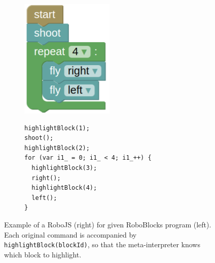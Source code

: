 

\begin{figure}[h]
\begin{subfigure}{.28\textwidth}
\centering\includegraphics[width=.8\textwidth]{img/roboblocks-english}
\end{subfigure}
\begin{subfigure}{.7\textwidth}
{\lstset{numbers=none}
\begin{lstlisting}
highlightBlock(1);
shoot();
highlightBlock(2);
for (var i1_ = 0; i1_ < 4; i1_++) {
  highlightBlock(3);
  right();
  highlightBlock(4);
  left();
}
\end{lstlisting}}
\end{subfigure}
\caption{%
  Example of a RoboJS (right) for given RoboBlocks program (left). %
  Each original command is accompanied by \texttt{highlightBlock(blockId)},
  so that the meta-interpreter knows which block to highlight.}
\label{fig:robojs-example}
\end{figure}



